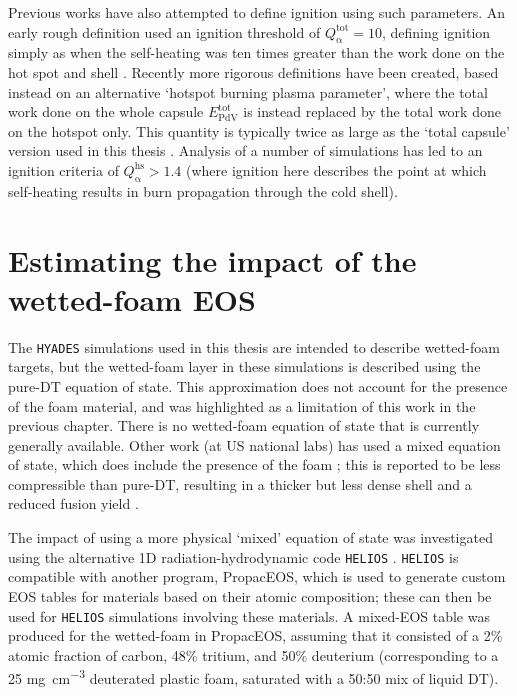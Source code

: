 Previous works have also attempted to define ignition using such parameters. An early rough definition used an ignition threshold of $Q^\mathrm{{tot}}_{\mathrm{\alpha}} = 10$, defining ignition simply as when the self-heating was ten times greater than the work done on the hot spot and shell \cite{Betti2011}. Recently more rigorous definitions have been created, based instead on an alternative `hotspot burning plasma parameter', where the total work done on the whole capsule $E^\mathrm{{tot}}_{\mathrm{PdV}}$ is instead replaced by the total work done on the hotspot only. This quantity is typically twice as large as the `total capsule' version used in this thesis \cite{Betti2015}. Analysis of a number of simulations has led to an ignition criteria of  $Q^\mathrm{{hs}}_{\mathrm{\alpha}} > 1.4$ \cite{Christopherson2020} (where ignition here describes the point at which self-heating results in burn propagation through the cold shell).

\section{Estimating the impact of the wetted-foam EOS} \label{sec:MixedEOS}

The \texttt{HYADES} simulations used in this thesis are intended to describe wetted-foam targets, but the wetted-foam layer in these simulations is described using the pure-DT equation of state. This approximation does not account for the presence of the foam material, and was highlighted as a limitation of this work in the previous chapter. There is no wetted-foam equation of state that is currently generally available. Other work (at US national labs) has used a mixed equation of state, which does include the presence of the foam \cite{Olson2021}; this is reported to be less compressible than pure-DT, resulting in a thicker but less dense shell and a reduced fusion yield \cite{Olson2020a}.

The impact of using a more physical `mixed' equation of state was investigated using the alternative 1D radiation-hydrodynamic code \texttt{HELIOS} \cite{MacFarlane2006}. \texttt{HELIOS} is compatible with another program, PropacEOS, which is used to generate custom EOS tables for materials based on their atomic composition; these can then be used for \texttt{HELIOS} simulations involving these materials. A mixed-EOS table was produced for the wetted-foam in PropacEOS, assuming that it consisted of a 2\% atomic fraction of carbon, 48\% tritium, and 50\% deuterium (corresponding to a 25 \unit{\milli\gram\per\centi\meter\cubed} deuterated plastic foam, saturated with a 50:50 mix of liquid DT). 

